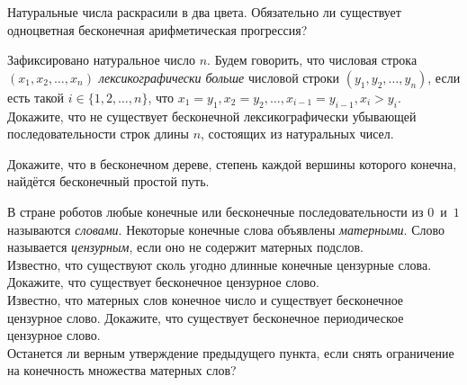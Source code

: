 \resetproblem \begingroup %
    \def\jeolmdate{5 июня 2018 г., пара 2}%
    \def\jeolmgroupname{Группа 9-2}%
    \def\jeolmauthors{Афризонов Д., Захаров Д., Кушнир А.}%
\jeolmheader \endgroup


\begin{problems}

\item Натуральные числа раскрасили в два цвета. Обязательно ли существует одноцветная бесконечная арифметическая прогрессия? 

\item Зафиксировано натуральное число $n$. Будем говорить, что числовая строка $(x_1, x_2, \ldots, x_n)$ \emph{лексикографически больше} числовой строки $(y_1, y_2, \ldots, y_n)$, если есть такой $i \in \{ 1, 2, \ldots, n \}$, что $x_1 = y_1, x_2 = y_2, \ldots, x_{i - 1} = y_{i - 1}, x_i > y_i$.  Докажите, что не существует бесконечной лексикографически убывающей последовательности строк длины $n$, состоящих из натуральных чисел.


\item {} Докажите, что в бесконечном дереве, степень каждой вершины которого конечна, найдётся бесконечный простой путь.

\item В стране роботов любые конечные или бесконечные последовательности из $0$~и~$1$ называются \emph{словами}. Некоторые конечные слова объявлены \emph{матерными}. Слово называется \emph{цензурным}, если оно не содержит матерных подслов.\\
\subproblem Известно, что существуют сколь угодно длинные конечные цензурные слова. Докажите, что существует бесконечное цензурное слово.\\
\subproblem Известно, что матерных слов конечное число и существует бесконечное цензурное слово. Докажите, что существует бесконечное периодическое цензурное слово.\\
\subproblem Останется ли верным утверждение предыдущего пункта, если снять ограничение на конечность множества матерных слов?


\end{problems}
